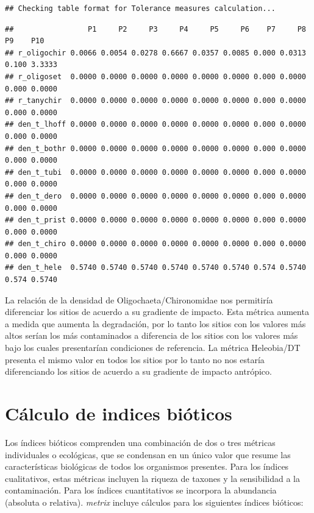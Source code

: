 \documentclass[
]{book}
\begin{document}
\begin{verbatim}
## Checking table format for Tolerance measures calculation...
\end{verbatim}

\begin{verbatim}
##                 P1     P2     P3     P4     P5     P6    P7     P8    P9    P10
## r_oligochir 0.0066 0.0054 0.0278 0.6667 0.0357 0.0085 0.000 0.0313 0.100 3.3333
## r_oligoset  0.0000 0.0000 0.0000 0.0000 0.0000 0.0000 0.000 0.0000 0.000 0.0000
## r_tanychir  0.0000 0.0000 0.0000 0.0000 0.0000 0.0000 0.000 0.0000 0.000 0.0000
## den_t_lhoff 0.0000 0.0000 0.0000 0.0000 0.0000 0.0000 0.000 0.0000 0.000 0.0000
## den_t_bothr 0.0000 0.0000 0.0000 0.0000 0.0000 0.0000 0.000 0.0000 0.000 0.0000
## den_t_tubi  0.0000 0.0000 0.0000 0.0000 0.0000 0.0000 0.000 0.0000 0.000 0.0000
## den_t_dero  0.0000 0.0000 0.0000 0.0000 0.0000 0.0000 0.000 0.0000 0.000 0.0000
## den_t_prist 0.0000 0.0000 0.0000 0.0000 0.0000 0.0000 0.000 0.0000 0.000 0.0000
## den_t_chiro 0.0000 0.0000 0.0000 0.0000 0.0000 0.0000 0.000 0.0000 0.000 0.0000
## den_t_hele  0.5740 0.5740 0.5740 0.5740 0.5740 0.5740 0.574 0.5740 0.574 0.5740
\end{verbatim}

La relación de la densidad de Oligochaeta/Chironomidae nos permitiría diferenciar los sitios de acuerdo a su gradiente de impacto.
Esta métrica aumenta a medida que aumenta la degradación, por lo tanto los sitios con los valores más altos serían los más contaminados a diferencia de los sitios con los valores más bajo los cuales presentarían condiciones de referencia.
La métrica Heleobia/DT presenta el mismo valor en todos los sitios por lo tanto no nos estaría diferenciando los sitios de acuerdo a su gradiente de impacto antrópico.

\hypertarget{cuxe1lculo-de-indices-biuxf3ticos}{%
\section{Cálculo de indices bióticos}\label{cuxe1lculo-de-indices-biuxf3ticos}}

Los índices bióticos comprenden una combinación de dos o tres métricas individuales o ecológicas, que se condensan en un único valor que resume las características biológicas de todos los organismos presentes.
Para los índices cualitativos, estas métricas incluyen la riqueza de taxones y la sensibilidad a la contaminación.
Para los índices cuantitativos se incorpora la abundancia (absoluta o relativa).
\emph{metrix} incluye cálculos para los siguientes índices bióticos:
\end{document}
